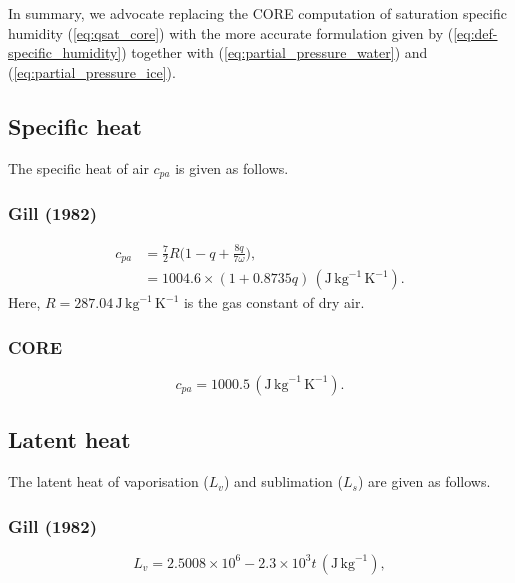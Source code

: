 \documentclass[dvipdfmx]{elsarticle_mod}
\begin{document}
In summary, we advocate replacing the CORE computation of saturation specific humidity (\ref{eq:qsat_core}) with the more accurate formulation given by (\ref{eq:def-specific_humidity}) together with (\ref{eq:partial_pressure_water}) and (\ref{eq:partial_pressure_ice}).

\subsection{Specific heat}

The specific heat of air $c_{\mathit{pa}}$ is given as follows.

\subsubsection{Gill (1982)}

\begin{align}
c_{\mathit{pa}} &= \frac{7}{2} R \Big( 1 - q + \frac{8q}{7\omega} \Big), \nonumber \\ 
    &= 1004.6 \times (1 + 0.8735 q) \,(\mathrm{J}\,\mathrm{kg}^{-1}\,\mathrm{K}^{-1}).
\end{align}
Here, $R = 287.04\, \mathrm{J}\,\mathrm{kg}^{-1}\,\mathrm{K}^{-1}$ is the gas constant of dry air.

\subsubsection{CORE}

\begin{equation}
 c_{\mathit{pa}} = 1000.5 \,(\mathrm{J} \,\mathrm{kg}^{-1} \,\mathrm{K}^{-1}).
\end{equation}


\subsection{Latent heat}

The latent heat of vaporisation ($L_v$) and sublimation ($L_s$) are given as follows.

\subsubsection{Gill (1982)}

\begin{equation}
   L_v = 2.5008 \times 10^{6} - 2.3 \times 10^{3} t\, (\mathrm{J}\,\mathrm{kg}^{-1}),
   \label{ch9-eq:l_kr}
\end{equation}
\end{document}
